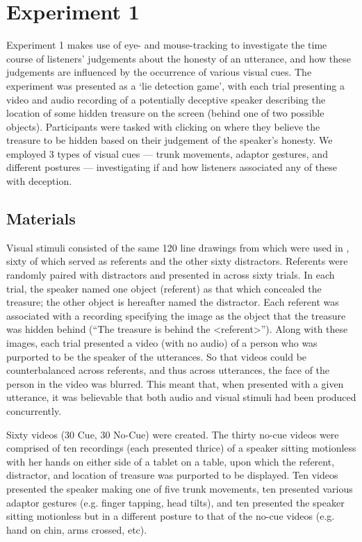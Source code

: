 \documentclass[a4paper,man,natbib]{apa6}
\begin{document}
\section{Experiment 1}
Experiment 1 makes use of eye- and mouse-tracking to investigate the time course of listeners' judgements about the honesty of an utterance, and how these judgements are influenced by the occurrence of various visual cues. 
The experiment was presented as a `lie detection game', with each trial presenting a video and audio recording of a potentially deceptive speaker describing the location of some hidden treasure on the screen (behind one of two possible objects). 
Participants were tasked with clicking on where they believe the treasure to be hidden based on their judgement of the speaker's honesty.
We employed 3 types of visual cues --- trunk movements, adaptor gestures, and different postures --- investigating if and how listeners associated any of these with deception.


\subsection{Materials}
Visual stimuli consisted of the same 120 line drawings from \citet{Snodgrass1980} which were used in \citet{Loy2017}, sixty of which served as referents and the other sixty distractors.
Referents were randomly paired with distractors and presented in across sixty trials. 
In each trial, the speaker named one object (referent) as that which concealed the treasure; the other object is hereafter named the distractor.
Each referent was associated with a recording specifying the image as the object that the treasure was hidden behind (``The treasure is behind the <referent>'').
Along with these images, each trial presented a video (with no audio) of a person who was purported to be the speaker of the utterances. 
So that videos could be counterbalanced across referents, and thus across utterances, the face of the person in the video was blurred. 
This meant that, when presented with a given utterance, it was believable that both audio and visual stimuli had been produced concurrently. 

Sixty videos (30 Cue, 30 No-Cue) were created. 
The thirty no-cue videos were comprised of ten recordings (each presented thrice) of a speaker sitting motionless with her hands on either side of a tablet on a table, upon which the referent, distractor, and location of treasure was purported to be displayed.
Ten videos presented the speaker making one of five trunk movements, ten presented various adaptor gestures (e.g. finger tapping, head tilts), and ten presented the speaker sitting motionless but in a different posture to that of the no-cue videos (e.g. hand on chin, arms crossed, etc).
\end{document}

